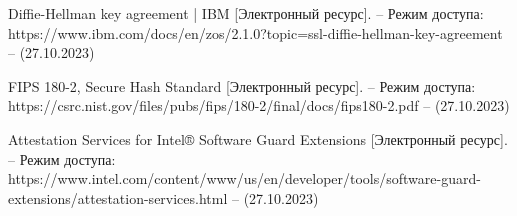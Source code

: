 \begin{thebibliography}{}
Diffie-Hellman key agreement | IBM [Электронный ресурс]. – Режим доступа: https://www.ibm.com/docs/en/zos/2.1.0?topic=ssl-diffie-hellman-key-agreement – (27.10.2023)

FIPS 180-2, Secure Hash Standard [Электронный ресурс]. – Режим доступа: https://csrc.nist.gov/files/pubs/fips/180-2/final/docs/fips180-2.pdf – (27.10.2023)

Attestation Services for Intel® Software Guard Extensions [Электронный ресурс]. – Режим доступа: https://www.intel.com/content/www/us/en/developer/tools/software-guard-extensions/attestation-services.html – (27.10.2023)

\end{thebibliography}
\endgroup

\pagebreak